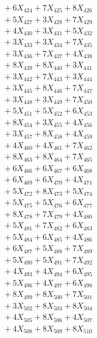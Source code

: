 \documentclass[a4paper,10pt]{article}
\begin{document}
{\begin{align}
&\;  + 6 X_{424} + 7 X_{425} + 8 X_{426} \\[0.3ex]
&\;  + 5 X_{427} + 3 X_{428} + 7 X_{429} \\[0.5ex]\allowbreak
&\;  + 4 X_{430} + 3 X_{431} + 5 X_{432} \\[0.3ex]
&\;  + 3 X_{433} + 3 X_{434} + 7 X_{435} \\[0.3ex]
&\;  + 3 X_{436} + 7 X_{437} + 4 X_{438} \\[0.3ex]
&\;  + 8 X_{439} + 8 X_{440} + 3 X_{441} \\[0.3ex]
&\;  + 3 X_{442} + 7 X_{443} + 3 X_{444} \\[0.3ex]
&\;  + 3 X_{445} + 8 X_{446} + 7 X_{447} \\[0.3ex]
&\;  + 3 X_{448} + 3 X_{449} + 7 X_{450} \\[0.3ex]
&\;  + 5 X_{451} + 5 X_{452} + 6 X_{453} \\[0.3ex]
&\;  + 8 X_{454} + 3 X_{455} + 4 X_{456} \\[0.3ex]
&\;  + 3 X_{457} + 8 X_{458} + 4 X_{459} \\[0.5ex]\allowbreak
&\;  + 4 X_{460} + 4 X_{461} + 7 X_{462} \\[0.3ex]
&\;  + 8 X_{463} + 8 X_{464} + 7 X_{465} \\[0.3ex]
&\;  + 6 X_{466} + 6 X_{467} + 6 X_{468} \\[0.3ex]
&\;  + 6 X_{469} + 6 X_{470} + 4 X_{471} \\[0.3ex]
&\;  + 5 X_{472} + 8 X_{473} + 5 X_{474} \\[0.3ex]
&\;  + 5 X_{475} + 5 X_{476} + 6 X_{477} \\[0.3ex]
&\;  + 8 X_{478} + 7 X_{479} + 4 X_{480} \\[0.3ex]
&\;  + 5 X_{481} + 7 X_{482} + 6 X_{483} \\[0.3ex]
&\;  + 5 X_{484} + 6 X_{485} + 4 X_{486} \\[0.3ex]
&\;  + 6 X_{487} + 5 X_{488} + 7 X_{489} \\[0.5ex]\allowbreak
&\;  + 5 X_{490} + 5 X_{491} + 7 X_{492} \\[0.3ex]
&\;  + 4 X_{493} + 4 X_{494} + 6 X_{495} \\[0.3ex]
&\;  + 5 X_{496} + 4 X_{497} + 6 X_{498} \\[0.3ex]
&\;  + 8 X_{499} + 8 X_{500} + 7 X_{501} \\[0.3ex]
&\;  + 3 X_{502} + 8 X_{503} + 8 X_{504} \\[0.3ex]
&\;  + 4 X_{505} + 8 X_{506} + 4 X_{507} \\[0.3ex]
&\;  + 4 X_{508} + 8 X_{509} + 8 X_{510} \\[0.3ex]

\end{align}}
\end{document}
